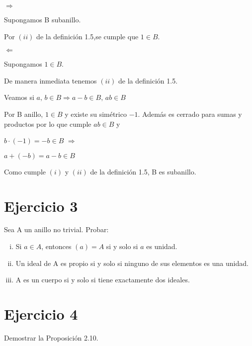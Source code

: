 \documentclass[10pt,a4paper]{article}
\begin{document}
	$\Rightarrow$
	
	Supongamos B subanillo.
	
	Por $(ii)$ de la definición 1.5,se cumple que  $1 \in B$.
	
	\hfill
	
	$\Leftarrow$
	
	Supongamos  $1 \in B$.
	
	De manera inmediata tenemos $(ii)$ de la definición 1.5.
	
	Veamos si $a,\, b \in B \Rightarrow a - b \in B , \, ab \in B$
	
	Por B anillo, $1\in B$ y existe su simétrico $-1$. Además es cerrado para sumas y productos por lo que cumple $ab\in B$ y 
	
	 $b\cdot (-1) = -b \in B$  $\Rightarrow$
	 
	 $a + (-b) = a - b \in B$
	
	\hfill
	
	Como cumple $(i)$ y $(ii)$ de la definición 1.5, B es subanillo.
	
	
	
	
	
	\section{Ejercicio 3}
	
	Sea A un anillo no trivial. Probar:
	
	\begin{enumerate}[(i)]
		\item Si $a\in A$, entonces $(a)=A$ si y solo si $a$ es unidad.
		
		
		
		\item Un ideal de A es propio si y solo si ninguno de sus elementos es una unidad.
		
		
		
		\item A es un cuerpo si y solo si tiene exactamente dos ideales.
		
		
		
		
	\end{enumerate}
	
	
	
	
	
	\section{Ejercicio 4}
	
	Demostrar la Proposición 2.10.
	
\end{document}
